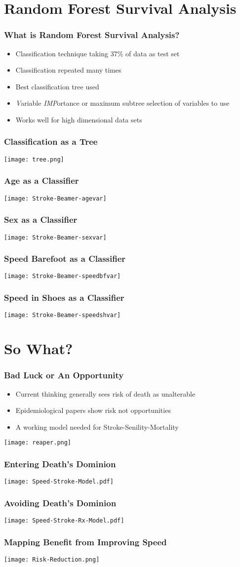\documentclass{beamer}
\begin{document}
\section{Random Forest Survival Analysis}
\begin{frame}\frametitle{What is Random Forest Survival Analysis?}
\begin{itemize}
  \item Classification technique taking 37\% of data as test set
  \item Classification repeated many times
  \item Best classification tree used
  \item \emph{V}ariable \emph{IMP}ortance or maximum subtree selection of variables to use
  \item Works well for high dimensional data sets
\end{itemize}
\end{frame}
\begin{frame}\frametitle{Classification as a Tree}
  \texttt{[image: tree.png]}
\end{frame}
\begin{frame}\frametitle{Age as a Classifier}
\texttt{[image: Stroke-Beamer-agevar]}
\end{frame}
\begin{frame}\frametitle{Sex as a Classifier}
\texttt{[image: Stroke-Beamer-sexvar]}
\end{frame}
\begin{frame}\frametitle{Speed Barefoot as a Classifier}
\texttt{[image: Stroke-Beamer-speedbfvar]}
\end{frame}
\begin{frame}\frametitle{Speed in Shoes as a Classifier}
\texttt{[image: Stroke-Beamer-speedshvar]}
\end{frame}
\section{So What?}
\begin{frame}\frametitle{Bad Luck or An Opportunity}
\begin{itemize}
  \item Current thinking generally sees risk of death as unalterable
  \item Epidemiological papers show risk not opportunities
  \item A working model needed for Stroke-Senility-Mortality
\end{itemize}
\texttt{[image: reaper.png]}
\end{frame}
\begin{frame}\frametitle{Entering Death's Dominion}
\texttt{[image: Speed-Stroke-Model.pdf]}
\end{frame}
\begin{frame}\frametitle{Avoiding Death's Dominion}
\texttt{[image: Speed-Stroke-Rx-Model.pdf]}
\end{frame}
\begin{frame}\frametitle{Mapping Benefit from Improving Speed}
\texttt{[image: Risk-Reduction.png]}
\end{frame}
\end{document}

